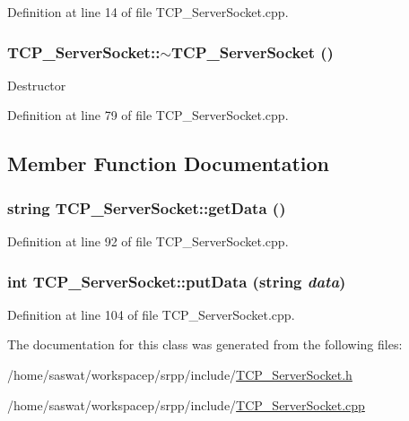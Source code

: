 Definition at line 14 of file TCP\_\-ServerSocket.cpp.

\hypertarget{class_t_c_p___server_socket_ad3b63e5500c4ddc3943b89db00ab1bb2}{
\subsubsection[{$\sim$TCP\_\-ServerSocket}]{\setlength{\rightskip}{0pt plus 5cm}TCP\_\-ServerSocket::$\sim$TCP\_\-ServerSocket ()}}
\label{class_t_c_p___server_socket_ad3b63e5500c4ddc3943b89db00ab1bb2}
Destructor 

Definition at line 79 of file TCP\_\-ServerSocket.cpp.



\subsection{Member Function Documentation}
\hypertarget{class_t_c_p___server_socket_ac36a6e5961e26d47a31dd817f7797076}{
\subsubsection[{getData}]{\setlength{\rightskip}{0pt plus 5cm}string TCP\_\-ServerSocket::getData ()}}
\label{class_t_c_p___server_socket_ac36a6e5961e26d47a31dd817f7797076}


Definition at line 92 of file TCP\_\-ServerSocket.cpp.

\hypertarget{class_t_c_p___server_socket_a5545e5d51411a8f9ee1d69e0e22be864}{
\subsubsection[{putData}]{\setlength{\rightskip}{0pt plus 5cm}int TCP\_\-ServerSocket::putData (string {\em data})}}
\label{class_t_c_p___server_socket_a5545e5d51411a8f9ee1d69e0e22be864}


Definition at line 104 of file TCP\_\-ServerSocket.cpp.



The documentation for this class was generated from the following files:\begin{DoxyCompactItemize}
\item 
/home/saswat/workspacep/srpp/include/\hyperlink{_t_c_p___server_socket_8h}{TCP\_\-ServerSocket.h}\item 
/home/saswat/workspacep/srpp/include/\hyperlink{_t_c_p___server_socket_8cpp}{TCP\_\-ServerSocket.cpp}\end{DoxyCompactItemize}
